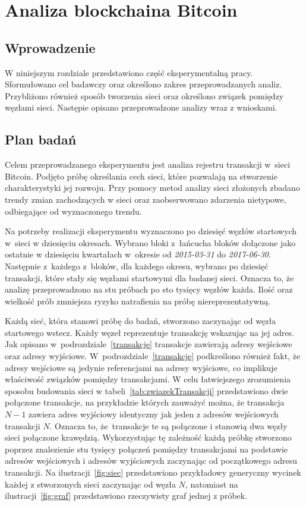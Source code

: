 \documentclass[12pt, twoside, final, openany]{mgr}
\begin{document}
\chapter{Analiza blockchaina Bitcoin}

\section{Wprowadzenie}

\indent W niniejszym rozdziale przedstawiono część eksperymentalną pracy. Sformułowano cel badawczy oraz określono zakres przeprowadzanych analiz. Przybliżono również sposób tworzenia sieci oraz określono związek pomiędzy węzłami sieci. Następie opisano przeprowadzone analizy wraz z wnioskami.

\section{Plan badań}

\indent Celem przeprowadzanego eksperymentu jest analiza rejestru transakcji w~sieci Bitcoin. Podjęto próbę określania cech sieci, które pozwalają na stworzenie charakterystyki jej rozwoju. Przy pomocy metod analizy sieci złożonych zbadano trendy zmian zachodzących w sieci oraz zaobserwowano zdarzenia nietypowe, odbiegające od wyznaczonego trendu. 

\indent Na potrzeby realizacji eksperymentu wyznaczono po dziesięć węzłów startowych w~sieci w dziesięciu okresach. Wybrano bloki z~łańcucha bloków dołączone jako ostatnie w dziesięciu kwartałach w~okresie od \textit{2015-03-31} do \textit{2017-06-30}. Następnie z~każdego z~bloków, dla każdego okresu, wybrano po dziesięć transakcji, które stały się węzłami startowymi dla badanej sieci. Oznacza to, że analizę przeprowadzono na stu próbach po sto tysięcy węzłów każda. Ilość oraz wielkość prób zmniejsza ryzyko natrafienia na próbę niereprezentatywną.

\indent Każdą sieć, która stanowi próbę do badań, stworzono zaczynając od węzła startowego wstecz. Każdy węzeł reprezentuje transakcję wskazując na jej adres. Jak opisano w~podrozdziale~\ref{transakcje} transakcje zawierają adresy wejściowe oraz adresy wyjściowe. W~podrozdziale~\ref{transakcje} podkreślono również fakt, że adresy wejściowe są jedynie referencjami na adresy wyjściowe, co implikuje właściwość związków pomiędzy transakcjami. W celu łatwiejszego zrozumienia sposobu budowania sieci w tabeli~\ref{tab:zwiazekTransakcji} przedstawiono dwie połączone transakcje, na przykładzie których zauważyć można, że transakcja $N-1$ zawiera adres wyjściowy identyczny jak jeden z adresów wejściowych transakcji $N$. Oznacza to, że~transakcje te są połączone i stanowią dwa węzły sieci połączone krawędzią. Wykorzystując tę zależność każdą próbkę stworzono poprzez znalezienie stu tysięcy połączeń pomiędzy transakcjami na podstawie adresów wejściowych i adresów wyjściowych zaczynając od początkowego adresu transakcji. Na ilustracji~\ref{fig:siec} przedstawiono przykładowy generyczny wycinek każdej z stworzonych sieci zaczynając od węzła $N$, natomiast na ilustracji~\ref{fig:graf} przedstawiono rzeczywisty graf jednej z próbek. 
\end{document}
